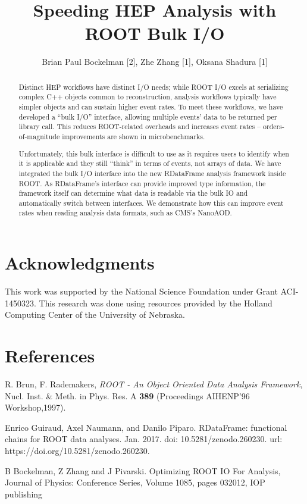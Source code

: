 \documentclass[12pt]{iopart}
\begin{document}
\title{Speeding HEP Analysis with ROOT Bulk I/O}

\author{Brian Paul Bockelman  [2], Zhe Zhang [1],  Oksana Shadura [1]}
\address{[1] University of Nebraska-Lincoln, USA [2] Morgridge Institute for Research, USA}
\vspace{10pt}

\begin{abstract}
Distinct HEP workflows have distinct I/O needs; while ROOT I/O excels at serializing complex C++ objects common to reconstruction, analysis workflows typically have simpler objects and can sustain higher event rates. To meet these workflows, we have developed a “bulk I/O” interface, allowing multiple events’ data to be returned per library call. This reduces ROOT-related overheads and increases event rates -- orders-of-magnitude improvements are shown in microbenchmarks.

Unfortunately, this bulk interface is difficult to use as it requires users to identify when it is applicable and they still “think” in terms of events, not arrays of data. We have integrated the bulk I/O interface into the new RDataFrame analysis framework inside ROOT. As RDataFrame’s interface can provide improved type information, the framework itself can determine what data is readable via the bulk IO and automatically switch between interfaces. We demonstrate how this can improve event rates when reading analysis data formats, such as CMS’s NanoAOD.
\end{abstract}







\section*{Acknowledgments}

This work was supported by the National Science Foundation under
Grant ACI-1450323. This research was done using resources provided
by the Holland Computing Center of the University of Nebraska.

\section*{References}

\begin{thebibliography}{10}

R. Brun, F. Rademakers, \textit{ROOT - An Object Oriented Data Analysis Framework}, Nucl. Inst. \& Meth. in Phys. Res. A  \textbf{389} (Proceedings AIHENP'96 Workshop,1997).

Enrico Guiraud, Axel Naumann, and Danilo Piparo. RDataFrame: functional chains for ROOT data analyses. Jan. 2017. doi: 10.5281/zenodo.260230. url: https://doi.org/10.5281/zenodo.260230.

B Bockelman, Z Zhang and J Pivarski. Optimizing ROOT IO For Analysis, Journal of Physics: Conference Series, Volume 1085, pages 032012, IOP publishing

\end{thebibliography}
\end{document}
